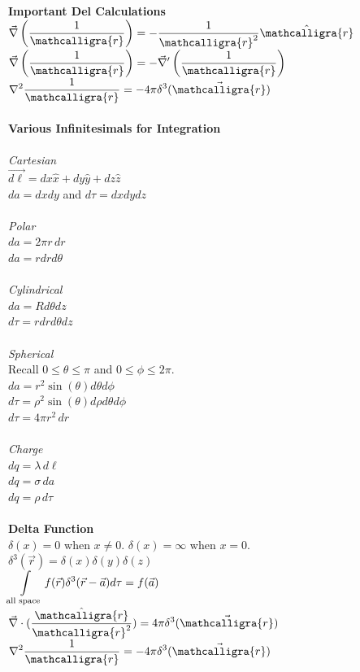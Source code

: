 \documentclass[12pt]{article}
\newcommand{\ds}{\displaystyle}
\newcommand{\scripty}[1]{\ensuremath{\mathcalligra{#1}}}
\begin{document}
\begin{flushleft}
\textbf{Important Del Calculations}\\
$\ds\vec{\nabla}\left(\frac{1}{\scripty{r}}\right)=-\frac{1}{\scripty{r}^2}\hat{\scripty{r}}$\\
$\ds\vec{\nabla}\left(\frac{1}{\scripty{r}}\right)=-\vec{\nabla}'\left(\frac{1}{\scripty{r}}\right)$\\
$\ds\nabla^2\frac{1}{\scripty{r}}=-4\pi\delta^3(\vec{\scripty{r}})$\\~\\

\textbf{Various Infinitesimals for Integration}\\~\\
\textit{Cartesian}\\
$\vec{d\ell}=dx\hat{x}+dy\hat{y}+dz\hat{z}$\\
$da=dxdy$ and $d\tau=dxdydz$\\~\\

\textit{Polar}\\
$da=2\pi r\,dr$\\
$da=rdrd\theta$\\~\\

\textit{Cylindrical}\\
$da=Rd\theta dz$\\
$d\tau=rdrd\theta dz$\\~\\

\textit{Spherical}\\
Recall $0\leq\theta\leq\pi$ and $0\leq\phi\leq2\pi$.\\
$da=r^2\sin(\theta)d\theta d\phi$\\
$d\tau=\rho^2\sin(\theta)d\rho d\theta d\phi$\\
$d\tau=4\pi r^2\,dr$\\~\\

\textit{Charge}\\
$dq=\lambda\,d\ell$\\
$dq=\sigma\,da$\\
$dq=\rho\,d\tau$\\~\\

\textbf{Delta Function}\\
$\delta(x)=0$ when $x\neq0$. $\delta(x)=\infty$ when $x=0$.\\
$\delta^3(\vec{r})=\delta(x)\delta(y)\delta(z)$\\
$\ds\int\displaylimits_{\text{all space}}f(\vec{r})\delta^3(\vec{r}-\vec{a})d\tau=f(\vec{a})$\\
$\ds\vec{\nabla}\cdot(\frac{\hat{\scripty{r}}}{\scripty{r}^2})=4\pi\delta^3(\vec{\scripty{r}})$\\
$\ds\nabla^2\frac{1}{\scripty{r}}=-4\pi\delta^3(\vec{\scripty{r}})$\\~\\


\end{flushleft}
\end{document}
